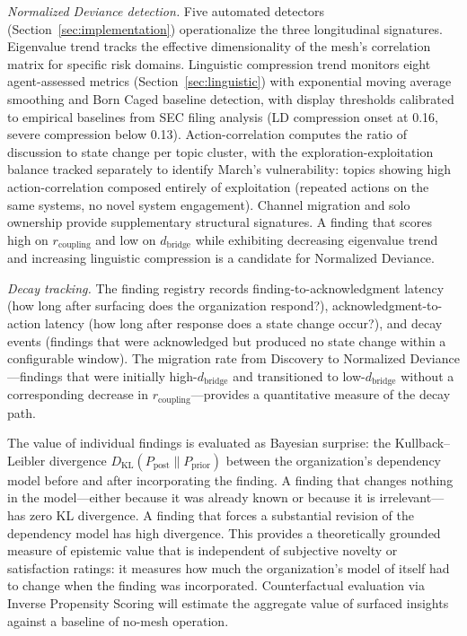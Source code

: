 \documentclass[11pt,a4paper]{article}
\begin{document}
\emph{Normalized Deviance detection.} Five automated detectors (Section~\ref{sec:implementation}) operationalize the three longitudinal signatures. Eigenvalue trend tracks the effective dimensionality of the mesh's correlation matrix for specific risk domains. Linguistic compression trend monitors eight agent-assessed metrics (Section~\ref{sec:linguistic}) with exponential moving average smoothing and Born Caged baseline detection, with display thresholds calibrated to empirical baselines from SEC filing analysis (LD compression onset at 0.16, severe compression below 0.13). Action-correlation computes the ratio of discussion to state change per topic cluster, with the exploration-exploitation balance tracked separately to identify March's \citeyear{march1991} vulnerability: topics showing high action-correlation composed entirely of exploitation (repeated actions on the same systems, no novel system engagement). Channel migration and solo ownership provide supplementary structural signatures. A finding that scores high on $r_{\text{coupling}}$ and low on $d_{\text{bridge}}$ while exhibiting decreasing eigenvalue trend and increasing linguistic compression is a candidate for Normalized Deviance.

\emph{Decay tracking.} The finding registry records finding-to-acknowledgment latency (how long after surfacing does the organization respond?), acknowledgment-to-action latency (how long after response does a state change occur?), and decay events (findings that were acknowledged but produced no state change within a configurable window). The migration rate from Discovery to Normalized Deviance---findings that were initially high-$d_{\text{bridge}}$ and transitioned to low-$d_{\text{bridge}}$ without a corresponding decrease in $r_{\text{coupling}}$---provides a quantitative measure of the decay path.

The value of individual findings is evaluated as Bayesian surprise: the Kullback--Leibler divergence $D_{\text{KL}}(P_{\text{post}} \| P_{\text{prior}})$ between the organization's dependency model before and after incorporating the finding. A finding that changes nothing in the model---either because it was already known or because it is irrelevant---has zero KL divergence. A finding that forces a substantial revision of the dependency model has high divergence. This provides a theoretically grounded measure of epistemic value that is independent of subjective novelty or satisfaction ratings: it measures how much the organization's model of itself had to change when the finding was incorporated. Counterfactual evaluation via Inverse Propensity Scoring will estimate the aggregate value of surfaced insights against a baseline of no-mesh operation.
\end{document}
